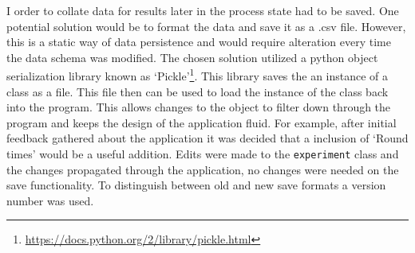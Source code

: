 I order to collate data for results later in the process state had to be saved. One potential solution would be to format the data and save it as a .csv file. However, this is a static way of data persistence and would require alteration every time the data schema was modified. The chosen solution utilized a python object serialization library known as `Pickle'\footnote{\url{https://docs.python.org/2/library/pickle.html}}. This library saves the an instance of a class as a file. This file then can be used to load the instance of the class back into the program. This allows changes to the object to filter down through the program and keeps the design of the application fluid. For example, after initial feedback gathered about the application it was decided that a inclusion of `Round times' would be a useful addition. Edits were made to the \verb|experiment| class and the changes propagated through the application, no changes were needed on the save functionality. To distinguish between old and new save formats a version number was used.